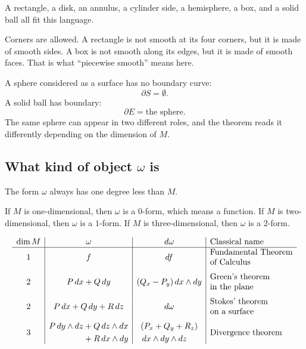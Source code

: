 A rectangle, a disk, an annulus, a cylinder side, a hemisphere, a box, and a solid ball
all fit this language.

Corners are allowed.  A rectangle is not smooth at its four corners, but it is made of
smooth sides.  A box is not smooth along its edges, but it is made of smooth faces.
That is what ``piecewise smooth'' means here.

A sphere considered as a surface has no boundary curve:
\[
    \partial S=\emptyset.
\]
A solid ball has boundary:
\[
    \partial E=\text{the sphere}.
\]
The same sphere can appear in two different roles, and the theorem reads it differently
depending on the dimension of \(M\).

\subsection{What kind of object \(\omega\) is}

The form \(\omega\) always has one degree less than \(M\).

If \(M\) is one-dimensional, then \(\omega\) is a \(0\)-form, which means a function.
If \(M\) is two-dimensional, then \(\omega\) is a \(1\)-form.  If \(M\) is
three-dimensional, then \(\omega\) is a \(2\)-form.

\[
\begin{array}{c|c|c|l}
\dim M & \omega & d\omega & \text{Classical name} \\ \hline
1 &
f &
df &
\begin{tabular}{@{}l@{}}Fundamental Theorem \\ of Calculus\end{tabular}
\\[4mm]
2 &
P\,dx+Q\,dy &
(Q_x-P_y)\,dx\wedge dy &
\begin{tabular}{@{}l@{}}Green's theorem \\ in the plane\end{tabular}
\\[4mm]
2 &
P\,dx+Q\,dy+R\,dz &
d\omega &
\begin{tabular}{@{}l@{}}Stokes' theorem \\ on a surface\end{tabular}
\\[4mm]
3 &
\begin{aligned}
    P\,dy\wedge dz &+ Q\,dz\wedge dx \\
    &+ R\,dx\wedge dy
\end{aligned} &
\begin{aligned}
    &(P_x+Q_y+R_z) \\
    &\,dx\wedge dy\wedge dz
\end{aligned} &
\text{Divergence theorem}
\end{array}
\]

